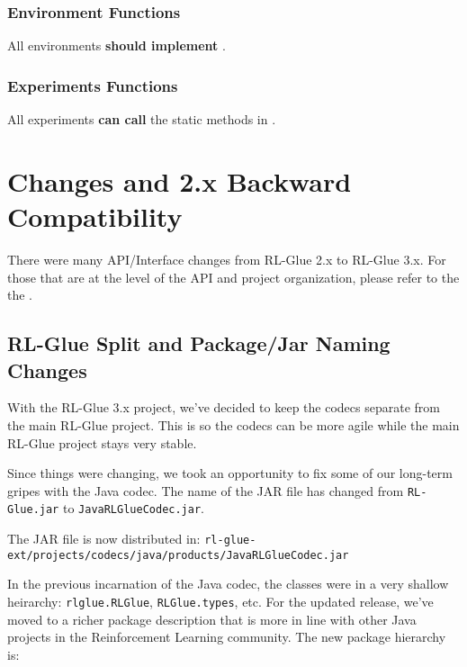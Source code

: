 \documentclass[11pt]{article}
\begin{document}
\subsubsection{Environment Functions}
All environments \textbf{should implement} .

\subsubsection{Experiments Functions}
All experiments \textbf{can call} the static methods in .

\section{Changes and 2.x Backward Compatibility}
There were many API/Interface changes from RL-Glue 2.x to RL-Glue 3.x.  For those that are at the level of the API and project organization, please refer to the the .

\subsection{RL-Glue Split and Package/Jar Naming Changes}
With the RL-Glue 3.x project, we've decided to keep the codecs separate from the main RL-Glue project.  This is so the codecs can be more agile while the main RL-Glue project stays very stable.

Since things were changing, we took an opportunity to fix some of our long-term gripes with the Java codec.  The name of the JAR file has changed from \texttt{RL-Glue.jar} to \texttt{JavaRLGlueCodec.jar}.

The JAR file is now distributed in:\newline
\texttt{rl-glue-ext/projects/codecs/java/products/JavaRLGlueCodec.jar}

In the previous incarnation of the Java codec, the classes were in a very shallow heirarchy: \texttt{rlglue.RLGlue}, \texttt{RLGlue.types}, etc.  For the updated release, we've moved to a richer package description that
is more in line with other Java projects in the Reinforcement Learning community.  The new package hierarchy is:\newline
{}
\end{document}
